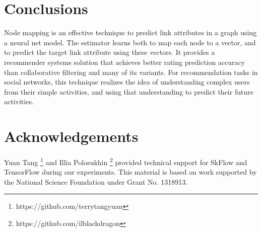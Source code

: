 \documentclass[twocolumn]{article}
\begin{document}
\section{Conclusions}
Node mapping is an effective technique to predict link attributes in a graph 
using a neural net model.
The estimator learns both to map each node to a vector, and to predict 
the target link attribute using these vectors.
It provides a recommender systems solution that achieves better rating 
prediction accuracy than collaborative filtering and many of its variants.
For recommendation tasks in social networks, this technique realizes the idea 
of understanding complex users from their simple activities, and using that 
understanding to predict their future activities.

\section*{Acknowledgements}
Yuan Tang \footnote{https://github.com/terrytangyuan} and Illia Polosukhin 
\footnote{https://github.com/ilblackdragon} provided technical support for 
SkFlow and TensorFlow during our experiments.
This material is based on work supported by the National Science Foundation 
under Grant No. 1318913.



\end{document}
